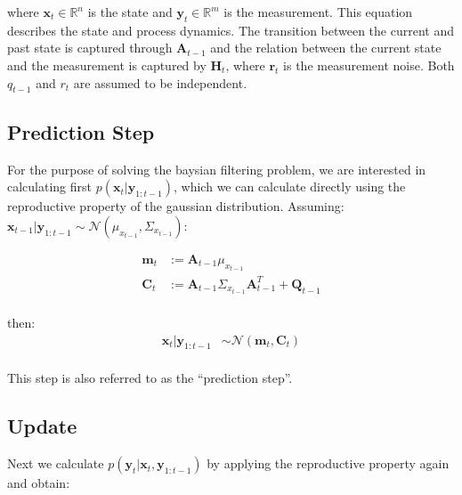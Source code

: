 \documentclass[
]{article}
\begin{document}
where \(\textbf{x}_t \in \mathbb{R}^n\) is the state and
\(\textbf{y}_t \in \mathbb{R}^m\) is the measurement. This equation
describes the state and process dynamics. The transition between the
current and past state is captured through \(\textbf{A}_{t-1}\) and the
relation between the current state and the measurement is captured by
\(\textbf{H}_t\), where \(\textbf{r}_t\) is the measurement noise. Both
\(q_{t-1}\) and \(r_t\) are assumed to be independent.

\hypertarget{prediction-step}{%
\subsection{Prediction Step}\label{prediction-step}}

For the purpose of solving the baysian filtering problem, we are
interested in calculating first \(p(\textbf{x}_t|\textbf{y}_{1:t-1})\),
which we can calculate directly using the reproductive property of the
gaussian distribution. Assuming:
\(\textbf{x}_{t-1}|\textbf{y}_{1:t-1} \sim \mathcal{N}(\mu_{x_{t-1}}, \Sigma_{x_{t-1}} )\):

\[
\begin{equation*}
    \begin{aligned}
        \textbf{m}_t &:=\textbf{A}_{t-1}\mu_{x_{t-1}} \\
        \textbf{C}_t &:= \textbf{A}_{t-1}\Sigma_{x_{t-1}}\textbf{A}_{t-1}^T + \textbf{Q}_{t-1} \\
\end{aligned}
\end{equation*}
\]

then: \[
\begin{equation}
    \begin{aligned}
        \textbf{x}_t|\textbf{y}_{1:t-1}  &\sim \mathcal{N}(\textbf{m}_t, \textbf{C}_t) \\
\end{aligned}
\end{equation}
\]

This step is also referred to as the ``prediction step''.

\hypertarget{update}{%
\subsection{Update}\label{update}}

Next we calculate \(p(\textbf{y}_t|\textbf{x}_t, \textbf{y}_{1:t-1})\)
by applying the reproductive property again and obtain:
\end{document}
